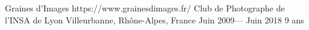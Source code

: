 \volunteerorganization%
{Graines d'Images}%
{https://www.grainesdimages.fr/}
{Club de Photographe de l'INSA de Lyon}%
{Villeurbanne, Rhône-Alpes, France}%
{Juin 2009--- Juin 2018}
{9 ans}
